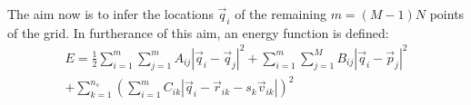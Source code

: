 \documentclass{article}
\begin{document}
The aim now is to infer the locations $\vec{q}_i$ of the remaining
$m=(M-1)N$ points of the grid.  In furtherance of this aim, an energy
function is defined:
\begin{equation}
  \begin{split}
    E = \frac{1}{2} \sum_{i=1}^m \sum_{j=1}^m A_{ij} |\vec{q}_i -
    \vec{q}_j|^2
    +  \sum_{i=1}^m \sum_{j=1}^M B_{ij} |\vec{q}_i -
    \vec{p}_j|^2 \\
    + \sum_{k=1}^{n_s} \left(\sum_{i=1}^m  C_{ik}|\vec{q}_i -
      \vec{r}_{ik} - s_k\vec{v}_{ik}|
    \right)^2
  \end{split}
\end{equation}
\end{document}
